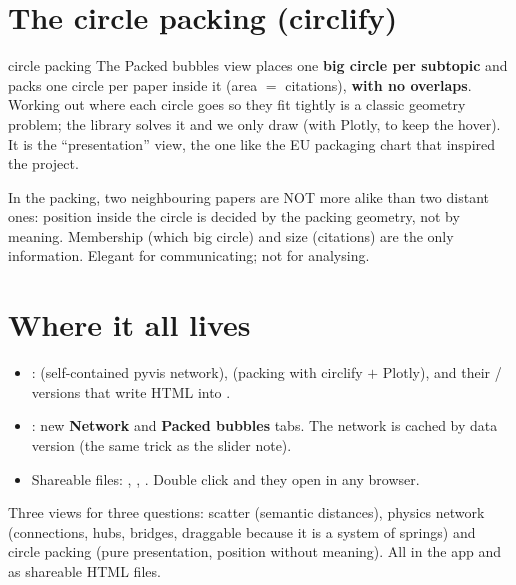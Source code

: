 \documentclass[11pt,a4paper]{article}
\begin{document}
\section{The circle packing (circlify)}

\begin{concepto}{circle packing}
The Packed bubbles view places one \textbf{big circle per subtopic} and packs one circle per
paper inside it (area $=$ citations), \textbf{with no overlaps}. Working out where each circle
goes so they fit tightly is a classic geometry problem; the  library solves it
and we only draw (with Plotly, to keep the hover). It is the ``presentation'' view, the one
like the EU packaging chart that inspired the project.
\end{concepto}

\begin{ojo}
In the packing, two neighbouring papers are NOT more alike than two distant ones: position
inside the circle is decided by the packing geometry, not by meaning. Membership (which big
circle) and size (citations) are the only information. Elegant for communicating; not for
analysing.
\end{ojo}

\section{Where it all lives}

\begin{itemize}
  \item {}:  (self-contained pyvis network),
         (packing with circlify $+$ Plotly), and their
        / versions that write HTML into
        .
  \item {}: new \textbf{Network} and \textbf{Packed bubbles} tabs. The network is
        cached by data version (the same trick as the slider note).
  \item Shareable files: , ,
        . Double click and they open in any browser.
\end{itemize}

\begin{resumen}
Three views for three questions: scatter (semantic distances), physics network (connections,
hubs, bridges, draggable because it is a system of springs) and circle packing (pure
presentation, position without meaning). All in the app and as shareable HTML files.
\end{resumen}
\clearpage
{}
{}
\end{document}
